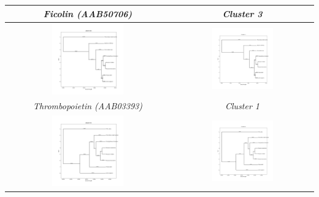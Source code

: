 \documentclass[11pt, a4paper, hidelinks]{article}
\begin{document}
\begin{longtable}{|c|c|}
        \hline
        \textit{Ficolin (AAB50706)} & \textit{Cluster 3} \\
        \hline
        \includegraphics[width=0.45\textwidth]{AAB03393.png} &
        \includegraphics[width=0.45\textwidth]{Cluster 1.png} \\
        \hline
        \textit{Thrombopoietin (AAB03393)} & \textit{Cluster 1} \\
        \hline
        \includegraphics[width=0.45\textwidth]{AAA63214.png} &
        \includegraphics[width=0.45\textwidth]{Cluster 6.png} \\

\end{longtable}
\end{document}
